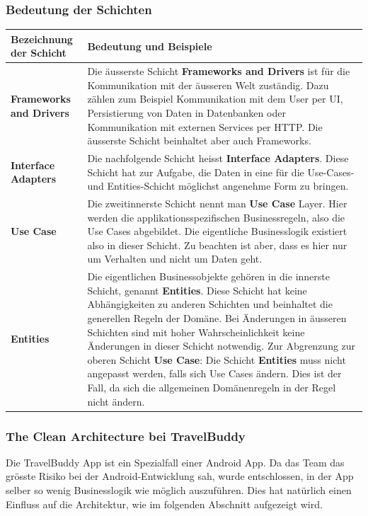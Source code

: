 \documentclass[a4paper,10pt,xetex]{article}
\begin{document}
\subsubsection{Bedeutung der Schichten}\label{layers}
\begin{longtabu} to \textwidth { | l | X[l] |  }
\hline
\textbf{Bezeichnung der Schicht} & \textbf{Bedeutung und Beispiele}\\\hline
\endhead
\textbf{Frameworks and Drivers} & Die äusserste Schicht \textbf{Frameworks and Drivers}
ist für die Kommunikation mit der äusseren Welt zuständig. Dazu zählen zum
Beispiel Kommunikation mit dem User per UI, Persistierung von Daten in Datenbanken
oder Kommunikation mit externen Services per HTTP. Die äusserste Schicht beinhaltet
aber auch Frameworks.\\\hline
\textbf{Interface Adapters} & Die nachfolgende Schicht heisst \textbf{Interface Adapters}.
Diese Schicht hat zur Aufgabe, die Daten in eine für die Use-Cases- und Entities-Schicht
möglichst angenehme Form zu bringen.\\\hline
\textbf{Use Case} & Die zweitinnerste Schicht nennt man \textbf{Use Case} Layer.
Hier werden die applikationsspezifischen Businessregeln, also die Use Cases abgebildet.
Die eigentliche Businesslogik existiert also in dieser Schicht. Zu beachten ist aber,
dass es hier nur um Verhalten und nicht um Daten geht.\\\hline
\textbf{Entities} & Die eigentlichen Businessobjekte gehören in die innerste
Schicht, genannt \textbf{Entities}. Diese Schicht hat keine Abhängigkeiten zu
anderen Schichten und beinhaltet die generellen Regeln der Domäne. Bei Änderungen
in äusseren Schichten sind mit hoher Wahrscheinlichkeit keine Änderungen in dieser
Schicht notwendig. Zur Abgrenzung zur oberen Schicht \textbf{Use Case}: Die Schicht \textbf{Entities}
muss nicht angepasst werden, falls sich Use Cases ändern. Dies ist der Fall, da
sich die allgemeinen Domänenregeln in der Regel nicht ändern.\\\hline
\end{longtabu}

\subsubsection{The Clean Architecture bei TravelBuddy}
Die TravelBuddy App ist ein Spezialfall einer Android App. Da das Team das grösste
Risiko bei der Android-Entwicklung sah, wurde entschlossen, in der App selber so
wenig Businesslogik wie möglich auszuführen.
Dies hat natürlich einen Einfluss auf die Architektur, wie im folgenden Abschnitt aufgezeigt wird.
\end{document}
